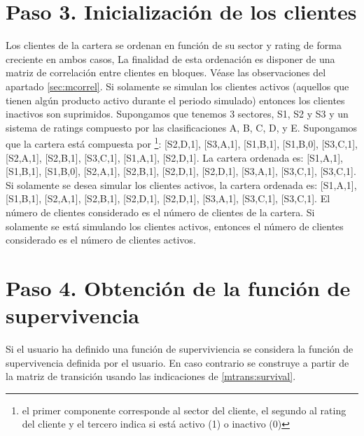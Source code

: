 \section{Paso 3. Inicializaci\'on de los clientes}

Los clientes de la cartera se ordenan en funci\'on de su sector
y rating de forma creciente en ambos casos, La finalidad de esta
ordenaci\'on es disponer de una matriz de correlaci\'on entre
clientes en bloques. V\'ease las observaciones del
apartado \ref{sec:mcorrel}. Si solamente se simulan los clientes activos 
(aquellos que tienen alg\'un producto activo durante el periodo simulado)
entonces los clientes inactivos son suprimidos.
\newline
\newline
Supongamos que tenemos 3 sectores, S1, S2 y S3 y un sistema de
ratings compuesto por las clasificaciones A, B, C, D, y E.
Supongamos que la cartera est\'a compuesta por \footnote{el
primer componente corresponde al sector del cliente, el segundo al
rating del cliente y el tercero indica si est\'a activo (1) o inactivo (0)}:
[S2,D,1], [S3,A,1], [S1,B,1], [S1,B,0], [S3,C,1], [S2,A,1], [S2,B,1], [S3,C,1],
[S1,A,1], [S2,D,1].
\newline
\newline
La cartera ordenada es:
[S1,A,1], [S1,B,1], [S1,B,0], [S2,A,1], [S2,B,1], [S2,D,1], [S2,D,1],
[S3,A,1], [S3,C,1], [S3,C,1].
\newline
\newline
Si solamente se desea simular los clientes activos, la cartera ordenada es:
[S1,A,1], [S1,B,1], [S2,A,1], [S2,B,1], [S2,D,1], [S2,D,1], [S3,A,1],
[S3,C,1], [S3,C,1].
\newline
\newline
El n\'umero de clientes considerado es el n\'umero de clientes de la cartera.
Si solamente se est\'a simulando los clientes activos, entonces el n\'umero
de clientes considerado es el n\'umero de clientes activos.


\section{Paso 4. Obtenci\'on de la funci\'on de supervivencia}

Si el usuario ha definido una funci\'on de superviviencia se considera 
la funci\'on de supervivencia definida por el usuario. En caso
contrario se construye a partir de la matriz de transici\'on
usando las indicaciones de \ref{mtrans:survival}.

